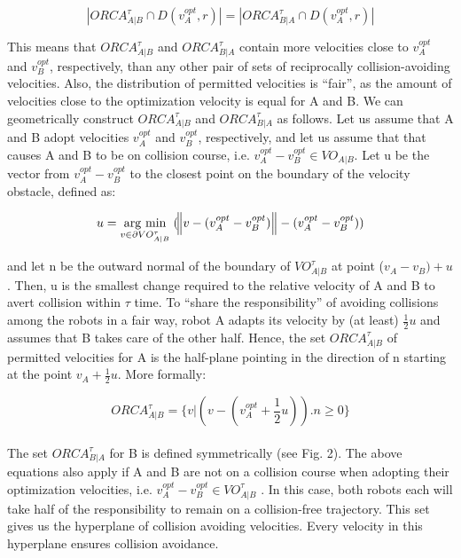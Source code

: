 \documentclass[12pt]{report}
\newcommand{\argmin}[1]{\underset{#1}{\operatorname{arg}\,\operatorname{min}}\;}
\begin{document}
\begin{equation}
|ORCA^{\tau}_{A|B} \cap D(v^{opt}_{A} , r)| = |ORCA^{\tau}_{B|A} \cap D(v^{opt}_{A} , r)|\tag{4}
\end{equation}

This means that $ORCA^{\tau}_{A|B}$ and $ORCA^{\tau}_{B|A}$ contain more velocities close to $v^{opt}_{A}$ and $v^{opt}_{B}$, respectively, than any other pair of sets of reciprocally collision-avoiding velocities. Also, the distribution of permitted velocities is “fair”, as the amount of velocities close to the optimization velocity is equal for A and B. We can geometrically construct $ORCA^{\tau}_{A|B}$ and $ORCA^{\tau}_{B|A}$ as follows. Let us assume that A and B adopt velocities $v^{opt}_{A}$ and $v^{opt}_{B}$, respectively, and let us assume that that causes A and B to be on collision course, i.e. $v^{opt}_{A} - v^{opt}_{B} \in VO_{A|B}$. Let u be the vector from $v^{opt}_{A} - v^{opt}_{B}$ to the closest point on the boundary of the velocity obstacle, defined as:

\begin{eqnarray}
u = \argmin{v \in \partial VO^{\tau}_{A|B}}(\norm {v-(v_{A}^{opt}-v_{B}^{opt})} - (v_{A}^{opt}-v_{B}^{opt}))\label{eq:dir}
\end{eqnarray}

and let n be the outward normal of the boundary of $VO^{\tau}_{A|B}$ at point ($v_{A} - v_{B} ) + u$. Then, u is the smallest change required to the relative velocity of A and B to avert collision within $\tau$ time. To “share the responsibility” of avoiding collisions among the robots in a fair way, robot A adapts its velocity by (at least) $\frac{1}{2}u$ and assumes that B takes care of the other half. Hence, the set $ORCA^{\tau}_{A|B}$ of permitted velocities for A is the half-plane pointing in the direction of n starting at the point $v_{A} + \frac{1}{2}u$. More formally:

\begin{equation}
ORCA^{\tau}_{A|B} = \{v|(v-(v_{A}^{opt} + \frac{1}{2}u)).n \geq 0\}\tag{5}
\end{equation}\\

The set $ORCA^{\tau}_{B|A}$ for B is defined symmetrically (see Fig. 2). The above equations also apply if A and B are not on a collision course when adopting their optimization velocities, i.e. $v^{opt}_{A} - v^{opt}_{B} \in VO^{\tau}_{A|B}$ . In this case, both robots each will take half of the responsibility to remain on a collision-free trajectory. This set gives us the hyperplane of collision avoiding velocities. Every velocity in this hyperplane ensures collision avoidance.
\end{document}

